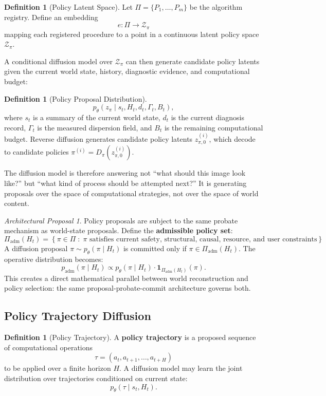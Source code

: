 \documentclass[12pt,a4paper]{article}
\theoremstyle{plain}
\theoremstyle{definition}
\newtheorem{definition}[theorem]{Definition}
\theoremstyle{remark}
\newtheorem{proposal}[theorem]{Architectural Proposal}
\begin{document}
\begin{definition}[Policy Latent Space]
Let $\Pi = \{P_1, \ldots, P_m\}$ be the algorithm registry. Define an embedding
\[
e : \Pi \to \mathcal{Z}_\pi
\]
mapping each registered procedure to a point in a continuous latent policy space $\mathcal{Z}_\pi$.
\end{definition}

A conditional diffusion model over $\mathcal{Z}_\pi$ can then generate candidate policy latents given the current world state, history, diagnostic evidence, and computational budget:

\begin{definition}[Policy Proposal Distribution]
\[
p_\theta(z_\pi \mid s_t, H_t, d_t, \Gamma_t, B_t),
\]
where $s_t$ is a summary of the current world state, $d_t$ is the current diagnosis record, $\Gamma_t$ is the measured dispersion field, and $B_t$ is the remaining computational budget. Reverse diffusion generates candidate policy latents $z_{\pi,0}^{(i)}$, which decode to candidate policies $\pi^{(i)} = D_\pi(z_{\pi,0}^{(i)})$.
\end{definition}

The diffusion model is therefore answering not ``what should this image look like?'' but ``what kind of process should be attempted next?'' It is generating proposals over the space of computational strategies, not over the space of world content.

\begin{proposal}
Policy proposals are subject to the same probate mechanism as world-state proposals. Define the \textbf{admissible policy set}:
\[
\Pi_{\mathrm{adm}}(H_t) = \left\{ \pi \in \Pi \;:\; \pi \text{ satisfies current safety, structural, causal, resource, and user constraints} \right\}.
\]
A diffusion proposal $\pi \sim p_\theta(\pi \mid H_t)$ is committed only if $\pi \in \Pi_{\mathrm{adm}}(H_t)$. The operative distribution becomes:
\[
p_{\mathrm{adm}}(\pi \mid H_t) \propto p_\theta(\pi \mid H_t) \cdot \mathbf{1}_{\Pi_{\mathrm{adm}}(H_t)}(\pi).
\]
This creates a direct mathematical parallel between world reconstruction and policy selection: the same proposal-probate-commit architecture governs both.
\end{proposal}

\subsection{Policy Trajectory Diffusion}

\begin{definition}[Policy Trajectory]
A \textbf{policy trajectory} is a proposed sequence of computational operations
\[
\tau = (a_t, a_{t+1}, \ldots, a_{t+H})
\]
to be applied over a finite horizon $H$. A diffusion model may learn the joint distribution over trajectories conditioned on current state:
\[
p_\theta(\tau \mid s_t, H_t).
\]
\end{definition}
\end{document}
